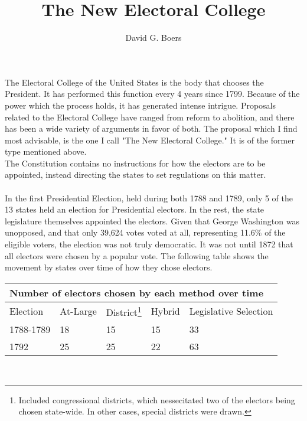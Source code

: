 \documentclass{article}
\title{The New Electoral College}
\author{David G. Boers}
\begin{document}
    \maketitle
    The Electoral College of the United States is the body that chooses the President. It has performed this function every 4 years since 1799. Because of the power which the process holds, it has generated intense intrigue. Proposals related to the Electoral College have ranged from reform to abolition, and there has been a wide variety of arguments in favor of both. The proposal which I find most advisable, is the one I call "The New Electoral College." It is of the former type mentioned above.\\
    
    The Constitution contains no instructions for how the electors are to be appointed, instead directing the states to set regulations on this matter.\\

    \\

    In the first Presidential Election, held during both 1788 and 1789, only 5 of the 13 states held an election for Presidential electors. In the rest, the state legislature themselves appointed the electors. Given that George Washington was unopposed, and that only 39,624 votes voted at all, representing 11.6\% of the eligible voters, the election was not truly democratic. It was not until 1872 that all electors were chosen by a popular vote. The following table shows the movement by states over time of how they chose electors.\\
    \begin{adjustbox}{center}
    \begin{tabular}{ |l|l|l|l|l| }
        \multicolumn{5}{|l|}{Number of electors chosen by each method over time} \\
        \hline
        Election & At-Large & District\footnote{Included congressional districts, which nessecitated two of the electors being chosen state-wide. In other cases, special districts were drawn.} & Hybrid & Legislative Selection \\
        \hline
        1788-1789 & 18 & 15 & 15 & 33 \\
        1792 & 25 & 25 & 22 & 63
    \end{tabular}
    \end{adjustbox} \\
\end{document}
